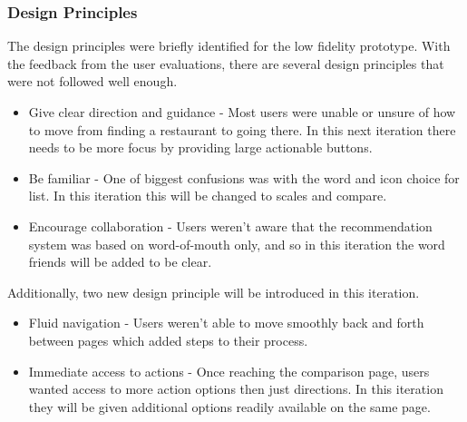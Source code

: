 \documentclass[a4 paper, 12pt]{article}
\begin{document}
    \subsubsection*{Design Principles}
    The design principles were briefly identified for the low fidelity prototype. With the feedback from the user evaluations, there are several design principles that were not followed well enough. 
        \begin{itemize}
            \item Give clear direction and guidance - Most users were unable or unsure of how to move from finding a restaurant to going there. In this next iteration there needs to be more focus by providing large actionable buttons.
            \item Be familiar - One of biggest confusions was with the word and icon choice for list. In this iteration this will be changed to scales and compare. 
            \item Encourage collaboration - Users weren't aware that the recommendation system was based on word-of-mouth only, and so in this iteration the word friends will be added to be clear.
        \end{itemize}

    Additionally, two new design principle will be introduced in this iteration.
        \begin{itemize}
            \item Fluid navigation - Users weren't able to move smoothly back and forth between pages which added steps to their process. 
            \item Immediate access to actions - Once reaching the comparison page, users wanted access to more action options then just directions. In this iteration they will be given additional options readily available on the same page.
        \end{itemize}
\end{document}

